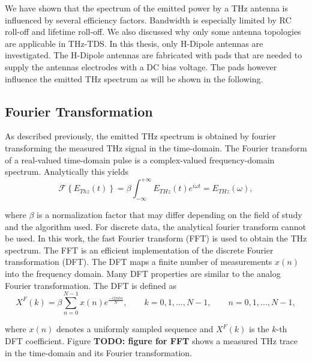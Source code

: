 We have shown that the spectrum of the emitted power by a THz antenna is influenced by several efficiency factors. Bandwidth is especially limited by RC roll-off and lifetime roll-off. We also discussed why only some antenna topologies are applicable in THz-TDS. In this thesis, only H-Dipole antennas are investigated. The H-Dipole antennas are fabricated with pads that are needed to supply the antennas electrodes with a DC bias voltage. The pads however influence the emitted THz spectrum as will be shown in the following. 

\subsection{Fourier Transformation}
As described previously, the emitted THz spectrum is obtained by fourier transforming the measured THz signal in the time-domain. The Fourier transform of a real-valued time-domain pulse is a complex-valued frequency-domain spectrum. Analytically this yields \cite{MathematicalMethodsPhysics} 
\begin{equation}
    \mathcal{F}\left\{
        E_{Thz}(t) 
    \right\} = \beta \int_{-\infty}^{+\infty} E_{THz}(t)e^{i\omega t} = E_{THz}(\omega),
\end{equation}

where $\beta$ is a normalization factor that may differ depending on the field of study and the algorithm used. For discrete data, the analytical fourier transform cannot be used. In this work, the fast Fourier transform (FFT) is used to obtain the THz spectrum. The FFT is an efficient implementation of the discrete Fourier transformation (DFT). The DFT maps a finite number of measurements $x(n)$ into the frequency domain. Many DFT properties are similar to the analog Fourier transformation. The DFT is defined as \cite{raoFastFourierTransform2010}
\begin{equation}
    X^F(k) = \beta \sum_{n = 0}^{N - 1}x(n)e^{\frac{-i2\pi k n}{N}}, \qquad k = 0, 1, ..., N-1, \qquad n = 0, 1, ..., N-1,
\end{equation}

where $x(n)$ denotes a uniformly sampled sequence and $X^F(k)$ is the $k$-th DFT coefficient. Figure \textbf{TODO: figure for FFT} shows a measured THz trace in the time-domain and its Fourier transformation.

